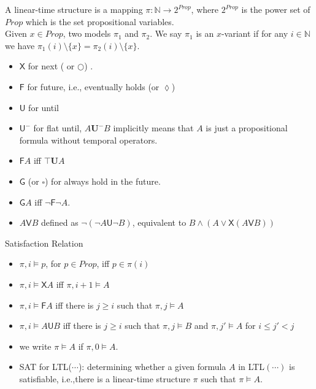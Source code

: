 \documentclass[12pt]{article}
\begin{document}
\begin{CJK*}{GBK}{song}
A linear-time structure is a mapping $\pi:\mathbb{N}\rightarrow 2^{Prop}$, where $2^{Prop}$ is the power set of $Prop$ which is the set propositional variables. \\

Given $x\in Prop$, two models $\pi_1$ and $\pi_2$. We say $\pi_1$ is an $x$-variant if for any $i\in\mathbb{N}$ we have $\pi_1(i)\setminus\{x\}=\pi_2(i)\setminus\{x\}$.

\begin{itemize}
\item $\textsf{X}$ for next ( or $\bigcirc$) .
\item $\textsf{F}$ for future, i.e., eventually holds (or $\lozenge$)
\item $\textsf{U}$ for until
\item $\textsf{U}^-$ for flat until, $A\mathbf{U}^-B$ implicitly means that $A$ is just a propositional formula without temporal operators.

\item $\textsf{F}A$ iff $\top\mathbf{U}A$

\item $\textsf{G}$ (or $\square$) for always hold in the future.
\item $\textsf{G}A$ iff $\neg \textsf{F}\neg A$.
\item $A\textsf{V} B$ defined as $\neg (\neg A\textsf{U}\neg B)$, equivalent to $B\wedge (A\vee \textsf{X}(A\textsf{V}B))$
\end{itemize}

Satisfaction Relation
\begin{itemize}
\item $\pi, i\models p$, for $p\in Prop$, iff $p\in \pi(i)$
 \item $\pi, i\models \textsf{X}A$ iff $\pi,i+1\models A$
 \item $\pi,i\models \textsf{F}A$ iff there is $j\geq i$ such that $\pi,j\models A$
 \item $\pi,i\models A\textsf{U} B$ iff there is $j\geq i$ such that $\pi,j\models B$ and $\pi,j'\models A$ for $i\leq j'<j$
\item we write $\pi\models A$ if $\pi,0\models A$.

\item SAT for LTL($\cdots$): determining whether a given formula $A$ in LTL$(\cdots)$ is satisfiable, i.e.,there is a linear-time structure $\pi$ such that $\pi\models A$.

\end{itemize}






\end{CJK*}
\end{document}
